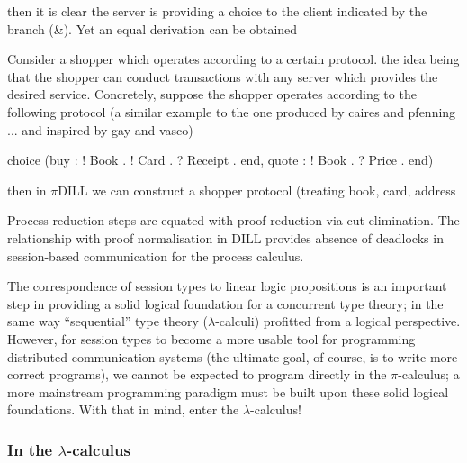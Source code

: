 \documentclass{mprop}
\newcommand{\1}{\textbf{1}\xspace}
\begin{document}
then it is clear the server is providing a choice to the client indicated by the branch (\&). Yet an equal derivation can be obtained

Consider a shopper which operates according to a certain protocol. the idea being that the shopper can conduct transactions with any server which provides the desired service. Concretely, suppose the shopper operates according to the following protocol (a similar example to the one produced by caires and pfenning ... and inspired by gay and vasco)

choice (buy : ! Book . ! Card . ? Receipt . end, quote : ! Book . ? Price . end)

then in $\pi$DILL we can construct a shopper protocol (treating book, card, address

Process reduction steps are equated with proof reduction via cut elimination. The relationship with proof normalisation in DILL provides absence of deadlocks in session-based communication for the process calculus.

The correspondence of session types to linear logic propositions is an important step in providing a solid logical foundation for a concurrent type theory; in the same way ``sequential'' type theory ($\lambda$-calculi) profitted from a logical perspective. However, for session types to become a more usable tool for programming distributed communication systems (the ultimate goal, of course, is to write more correct programs), we cannot be expected to program directly in the $\pi$-calculus; a more mainstream programming paradigm must be built upon these solid logical foundations. With that in mind, enter the $\lambda$-calculus!

\subsubsection{In the \texorpdfstring{$\lambda$}{lambda}-calculus}
\label{sec:lam}
\end{document}
